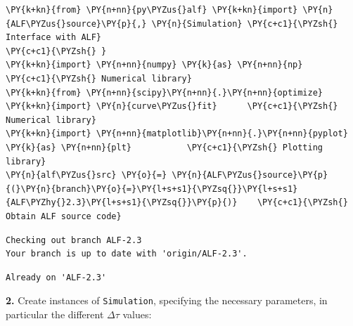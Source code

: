     \begin{tcolorbox}[breakable, size=fbox, boxrule=1pt, pad at break*=1mm,colback=cellbackground, colframe=cellborder]
\begin{Verbatim}[commandchars=\\\{\}]
\PY{k+kn}{from} \PY{n+nn}{py\PYZus{}alf} \PY{k+kn}{import} \PY{n}{ALF\PYZus{}source}\PY{p}{,} \PY{n}{Simulation} \PY{c+c1}{\PYZsh{} Interface with ALF}
\PY{c+c1}{\PYZsh{} }
\PY{k+kn}{import} \PY{n+nn}{numpy} \PY{k}{as} \PY{n+nn}{np}                        \PY{c+c1}{\PYZsh{} Numerical library}
\PY{k+kn}{from} \PY{n+nn}{scipy}\PY{n+nn}{.}\PY{n+nn}{optimize} \PY{k+kn}{import} \PY{n}{curve\PYZus{}fit}      \PY{c+c1}{\PYZsh{} Numerical library}
\PY{k+kn}{import} \PY{n+nn}{matplotlib}\PY{n+nn}{.}\PY{n+nn}{pyplot} \PY{k}{as} \PY{n+nn}{plt}           \PY{c+c1}{\PYZsh{} Plotting library}
\PY{n}{alf\PYZus{}src} \PY{o}{=} \PY{n}{ALF\PYZus{}source}\PY{p}{(}\PY{n}{branch}\PY{o}{=}\PY{l+s+s1}{\PYZsq{}}\PY{l+s+s1}{ALF\PYZhy{}2.3}\PY{l+s+s1}{\PYZsq{}}\PY{p}{)}    \PY{c+c1}{\PYZsh{} Obtain ALF source code}
\end{Verbatim}
\end{tcolorbox}

    \begin{Verbatim}[commandchars=\\\{\}]
Checking out branch ALF-2.3
Your branch is up to date with 'origin/ALF-2.3'.
    \end{Verbatim}

    \begin{Verbatim}[commandchars=\\\{\}]
Already on 'ALF-2.3'
    \end{Verbatim}

    \textbf{2.} Create instances of \texttt{Simulation}, specifying the
necessary parameters, in particular the different \(\Delta \tau\)
values:

